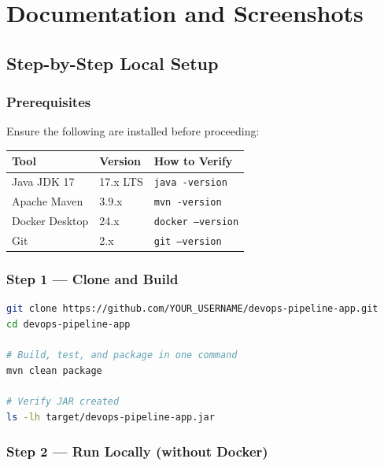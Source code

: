 \documentclass[12pt,a4paper]{report}
\begin{document}
\chapter{Documentation and Screenshots}

\section{Step-by-Step Local Setup}

\subsection{Prerequisites}

Ensure the following are installed before proceeding:

\begin{center}
\begin{tabular}{lll}
\toprule
\textbf{Tool}    & \textbf{Version} & \textbf{How to Verify} \\
\midrule
Java JDK 17      & 17.x LTS         & \texttt{java -version} \\
Apache Maven     & 3.9.x            & \texttt{mvn -version} \\
Docker Desktop   & 24.x             & \texttt{docker --version} \\
Git              & 2.x              & \texttt{git --version} \\
\bottomrule
\end{tabular}
\end{center}

\subsection{Step 1 — Clone and Build}

\begin{lstlisting}[language=bash]
git clone https://github.com/YOUR_USERNAME/devops-pipeline-app.git
cd devops-pipeline-app

# Build, test, and package in one command
mvn clean package

# Verify JAR created
ls -lh target/devops-pipeline-app.jar
\end{lstlisting}

\subsection{Step 2 — Run Locally (without Docker)}
\end{document}

